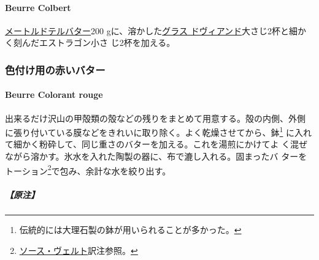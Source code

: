 \begin{recette}
\hypertarget{beurre-colbert}{%
\paragraph{Beurre Colbert}\label{beurre-colbert}}


\protect\hyperlink{beurre-maitre-d-hotel}{メートルドテルバター}200
gに、溶かした\protect\hyperlink{glace-de-viande}{グラス
ドヴィアンド}大さじ2杯と細かく刻んだエストラゴン小さ じ2杯を加える。

\maeaki

\hypertarget{ux8272ux4ed8ux3051ux7528ux306eux8d64ux3044ux30d0ux30bfux30fc}{%
\subsubsection{色付け用の赤いバター}\label{ux8272ux4ed8ux3051ux7528ux306eux8d64ux3044ux30d0ux30bfux30fc}}

\hypertarget{beurre-colorant-rouge}{%
\paragraph{Beurre Colorant rouge}\label{beurre-colorant-rouge}}


出来るだけ沢山の甲殻類の殻などの残りをまとめて用意する。殻の内側、外側
に張り付いている膜などをきれいに取り除く。よく乾燥させてから、鉢\footnote{伝統的には大理石製の鉢が用いられることが多かった。}
に入れて細かく粉砕して、同じ重さのバターを加える。これを湯煎にかけてよ
く混ぜながら溶かす。氷水を入れた陶製の器に、布で漉し入れる。固まったバ
ターをトーション\footnote{\protect\hyperlink{sauce-verte}{ソース・ヴェルト}訳注参照。}で包み、余計な水を絞り出す。

\hypertarget{ux539fux6ce8}{%
\subparagraph{【原注】}\label{ux539fux6ce8}}


\end{recette}
